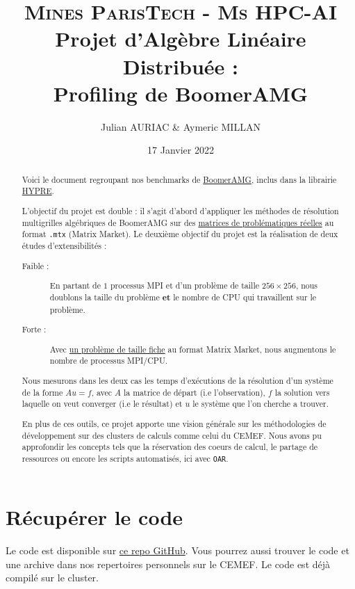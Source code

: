 \documentclass[10pt,twocolumn,letterpaper]{article}
\title{
		\usefont{OT1}{bch}{b}{n}
		\normalfont \normalsize \textsc{Mines ParisTech - Ms HPC-AI} \\ [10pt]
		\huge Projet d'Algèbre Linéaire Distribuée :\\ Profiling de BoomerAMG \\
}
\author{Julian AURIAC \& Aymeric MILLAN}
\affil{Cours de Christophe BOVET}
\date{17 Janvier 2022}
\def\code#1{\texttt{#1}}
\begin{document}
\maketitle

\begin{abstract}
Voici le document regroupant nos benchmarks de
\href{https://hypre.readthedocs.io/en/latest/solvers-boomeramg.html}{BoomerAMG},
inclus dans la librairie
\href{https://hypre.readthedocs.io/en/latest/index.html}{HYPRE}.

L'objectif du projet est double : il s'agit d'abord d'appliquer les méthodes de
résolution multigrilles algébriques de BoomerAMG sur des
\href{https://sparse.tamu.edu/}{matrices de problématiques réelles} au format
\code{.mtx} (Matrix Market).
Le deuxième objectif du projet est la réalisation de deux études
d'extensibilités :
\begin{description}
    \item [\textbullet\space Faible :] En partant de $1$ processus MPI et
d'un problème de taille $256 \times 256$, nous doublons la taille du problème
\textbf{et} le nombre de CPU qui travaillent sur le problème.
    \item [\textbullet\space Forte :] Avec
\href{https://sparse.tamu.edu/Janna/Emilia_923}{un problème de taille fiche}
au format Matrix Market, nous augmentons le nombre de processus MPI/CPU.
\end{description}

Nous mesurons dans les deux cas les temps d'exécutions de la résolution d'un
système de la forme $Au = f$, avec $A$ la matrice de départ (i.e l'observation),
$f$ la solution vers laquelle on veut converger (i.e le résultat) et $u$
le système que l'on cherche a trouver.

En plus de ces outils, ce projet apporte une vision générale sur les
méthodologies de développement sur des clusters de calculs comme celui du CEMEF. 
Nous avons pu approfondir les concepts tels que la réservation des coeurs de
calcul, le partage de ressources ou encore les scripts automatisés,
ici avec \code{OAR}.
\end{abstract}

\section{Récupérer le code}
Le code est disponible sur
\href{https://github.com/Aympab/HypreBoomerAMG_Benchmark}{ce repo GitHub}.
Vous pourrez aussi trouver le code et une archive dans nos repertoires
personnels sur le CEMEF. Le code est déjà compilé sur le cluster.
\end{document}
